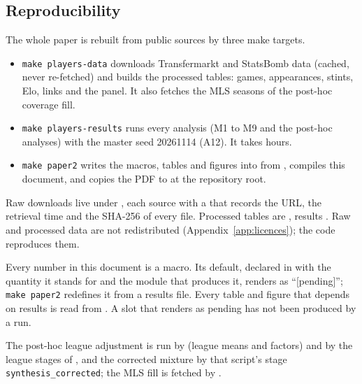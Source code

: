 \documentclass[11pt,a4paper]{article}
\begin{document}
\clearpage
\begin{appendices}

\section{Reproducibility}
\label{app:repro}

The whole paper is rebuilt from public sources by three make targets.

\begin{itemize}
  \item \texttt{make players-data} downloads Transfermarkt and StatsBomb data
    (cached, never re-fetched) and builds the processed tables: games,
    appearances, stints, Elo, links and the panel. It also fetches the MLS
    seasons of the post-hoc coverage fill.
  \item \texttt{make players-results} runs every analysis (M1 to M9 and the
    post-hoc analyses) with the master seed 20261114 (A12). It takes hours.
  \item \texttt{make paper2} writes the macros, tables and figures into
     from , compiles
    this document, and copies the PDF to
     at the repository root.
\end{itemize}

Raw downloads live under , each source with a
 that records the URL, the retrieval time and the SHA-256
of every file. Processed tables are ,
results . Raw and processed data are not
redistributed (Appendix~\ref{app:licences}); the code reproduces them.

Every number in this document is a macro. Its default, declared in
 with the quantity it stands for
and the module that produces it, renders as ``[pending]''; \texttt{make paper2}
redefines it from a results file. Every table and figure that depends on
results is read from . A slot that renders as pending has
not been produced by a run.

The post-hoc league adjustment is run by
 (league means and factors) and by the
league stages of , and the corrected
mixture by that script's stage \texttt{synthesis\_corrected}; the MLS fill is
fetched by .


\end{appendices}
\end{document}
